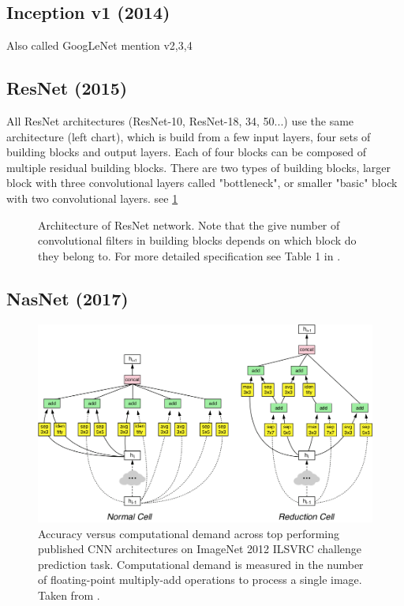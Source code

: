 \subsection*{Inception v1 (2014)}
\label{sec:inception}
Also called GoogLeNet
mention v2,3,4

\subsection*{ResNet (2015)}
\label{sec:resnet}

All ResNet \cite{bib:resnet} architectures (ResNet-10, ResNet-18, 34, 50...) use the same architecture (left chart), which is build from a few input layers, four sets of building blocks and output layers. Each of four blocks can be composed of multiple residual building blocks. There are two types of building blocks, larger block with three convolutional layers called "bottleneck", or smaller "basic" block with two convolutional layers.  see \cref{fig:resnet_arch}

\begin{figure}
    \label{fig:resnet_arch}
    \resnetArch
    \caption{Architecture of ResNet network.
    Note that the give number of convolutional filters in building blocks depends on which block do they belong to. For more detailed specification see Table 1 in  \cite{bib:resnet}.}
\end{figure}

\subsection*{NasNet (2017)}
\label{sec:nasnet}

\begin{figure}
    \label{fig:cnncomp}
    \includegraphics[width=\textwidth]{img/nasnet}
    \caption{Accuracy versus computational demand across top performing published CNN architectures on ImageNet 2012 ILSVRC challenge prediction task. Computational demand is measured in the number of floating-point multiply-add operations to process a single image. Taken from \cite{bib:nasnet}.}
\end{figure}





